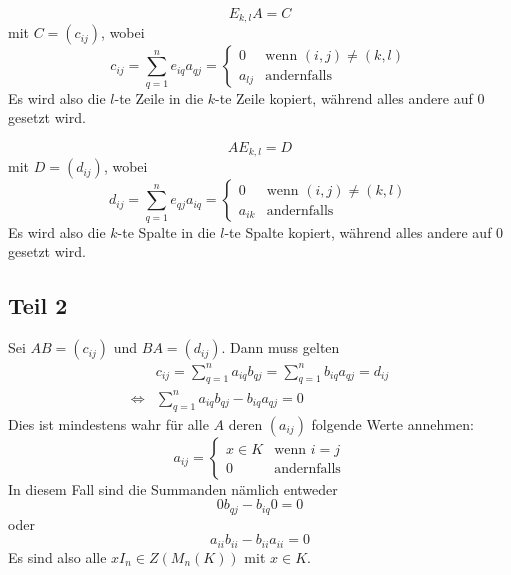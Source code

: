 \documentclass[a4paper,10pt]{article}
\begin{document}
\begin{equation}
 E_{k,l}A = C
\end{equation}
mit $C = (c_{ij})$, wobei
\begin{equation}
 c_{ij} = \sum_{q = 1}^n e_{iq}a_{qj} =
   \begin{cases}
    0 & \text{wenn $(i,j) \ne (k,l)$}\\
    a_{lj} & \text{andernfalls}
   \end{cases}
\end{equation}
Es wird also die $l$-te Zeile in die $k$-te Zeile kopiert, während alles andere auf $0$ gesetzt wird.

\begin{equation}
 AE_{k,l} = D
\end{equation}
mit $D = (d_{ij})$, wobei
\begin{equation}
 d_{ij} = \sum_{q = 1}^n e_{qj}a_{iq} =
   \begin{cases}
    0 & \text{wenn $(i,j) \ne (k,l)$}\\
    a_{ik} & \text{andernfalls}
   \end{cases}
\end{equation}
Es wird also die $k$-te Spalte in die $l$-te Spalte kopiert, während alles andere auf $0$ gesetzt wird.

\subsection*{Teil 2}

Sei $AB = (c_{ij})$ und $BA = (d_{ij})$.
Dann muss gelten
\begin{align}
 & c_{ij} = \sum_{q = 1}^n a_{iq}b_{qj} = \sum_{q = 1}^n b_{iq}a_{qj} = d_{ij}\\
 \Leftrightarrow & \sum_{q = 1}^n a_{iq}b_{qj} - b_{iq}a_{qj} = 0
\end{align}
Dies ist mindestens wahr für alle $A$ deren $(a_{ij})$ folgende Werte annehmen:
\begin{equation}
 a_{ij} =
   \begin{cases}
    x \in K & \text{wenn $i = j$}\\
    0 & \text{andernfalls}
   \end{cases}
\end{equation}
In diesem Fall sind die Summanden nämlich entweder
\begin{equation}
 0b_{qj} - b_{iq}0 = 0
\end{equation}
oder
\begin{equation}
 a_{ii}b_{ii} - b_{ii}a_{ii} = 0
\end{equation}
Es sind also alle $xI_n \in Z(M_n(K))$ mit $x \in K$.
\end{document}
